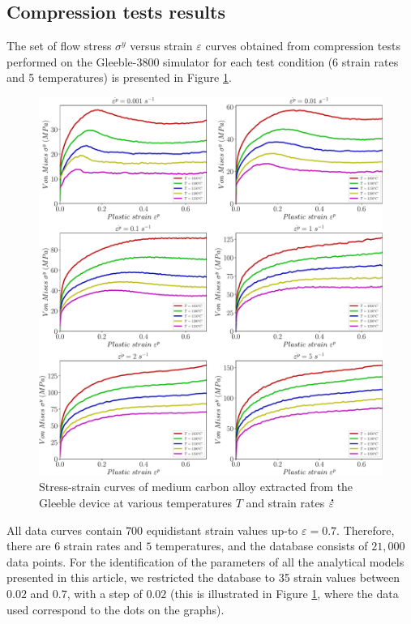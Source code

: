 \documentclass[metals,article,submit,pdftex,moreauthors]{Definitions/mdpi}
\DeclareRobustCommand{\mdot}[1]{\accentset{\mbox{\bfseries .}}{#1}}
\begin{document}
\subsection{Compression tests results\label{sec:ComTestResults}}

The set of flow stress $\sigma^y$ versus strain $\varepsilon$ curves obtained from compression tests performed on the Gleeble-3800 simulator for each test condition (6 strain rates and 5 temperatures) is presented in Figure \ref{fig:RawData}.
\begin{figure}[!ht]
\centering
\includegraphics[width=\columnwidth]{Figures/rawData}
\caption{Stress-strain curves of medium carbon alloy extracted from the Gleeble device at various temperatures $T$ and strain rates $\mdot\varepsilon$}
\label{fig:RawData}
\end{figure}
All data curves contain $700$ equidistant strain values up-to $\varepsilon=0.7$.
Therefore, there are $6$ strain rates and $5$ temperatures, and the database consists of $21,000$ data points.
For the identification of the parameters of all the analytical models presented in this article, we restricted the database to 35 strain values between $0.02$ and $0.7$, with a step of $0.02$ (this is illustrated in Figure \ref{fig:RawData}, where the data used correspond to the dots on the graphs).
\end{document}
